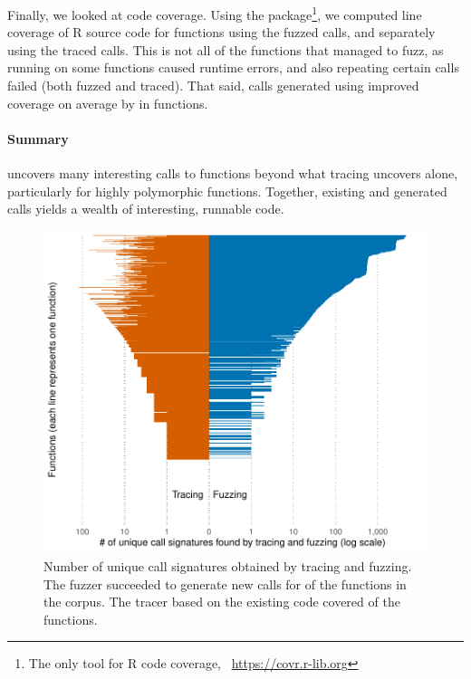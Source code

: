 \documentclass[sigplan,anonymous,review]{acmart}
\begin{document}
Finally, we looked at code coverage.
Using the  package\footnote{The only tool for R code coverage, \Cf~\url{https://covr.r-lib.org}}, we computed line coverage of R source code for \UFNumFunctionsWithBothCoverage functions using the fuzzed calls, and separately using the traced calls.
This is not all of the functions that \tool managed to fuzz, as running  on some functions caused runtime errors, and also repeating certain calls failed (both fuzzed and traced).
That said, calls generated using \tool improved coverage on average by \UFBetterCoverageMean in \UFBetterCoverage functions.

\paragraph{Summary}

\tool uncovers many interesting calls to functions beyond what tracing uncovers alone, particularly for highly polymorphic functions.
Together, existing and generated calls yields a wealth of interesting, runnable code.


\begin{figure}
    \centering
    \includegraphics[width=\columnwidth]{code-and-figures/uf-call-signatures.pdf}
    \caption{Number of unique call signatures obtained by tracing and fuzzing. The fuzzer succeeded to generate new calls for \UFNumFunctionsSignatrToCorpusSignatureRatio of the functions in the corpus. The tracer based on the existing code covered \UFNumFunctionsBaselineToCorpusSignatureRatio of the functions.}
    \label{fig:call-signatures}
\end{figure}
\end{document}
